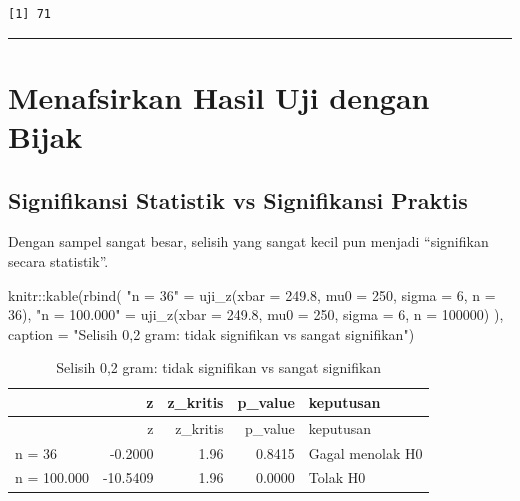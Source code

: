 \documentclass[
  indonesian,
  letterpaper,
]{book}
\newenvironment{Shaded}{\begin{snugshade}}{\end{snugshade}}
\newcommand{\AttributeTok}[1]{\textcolor[rgb]{0.40,0.45,0.13}{#1}}
\newcommand{\DecValTok}[1]{\textcolor[rgb]{0.68,0.00,0.00}{#1}}
\newcommand{\FloatTok}[1]{\textcolor[rgb]{0.68,0.00,0.00}{#1}}
\newcommand{\FunctionTok}[1]{\textcolor[rgb]{0.28,0.35,0.67}{#1}}
\newcommand{\NormalTok}[1]{\textcolor[rgb]{0.00,0.23,0.31}{#1}}
\newcommand{\OtherTok}[1]{\textcolor[rgb]{0.00,0.23,0.31}{#1}}
\newcommand{\SpecialCharTok}[1]{\textcolor[rgb]{0.37,0.37,0.37}{#1}}
\newcommand{\StringTok}[1]{\textcolor[rgb]{0.13,0.47,0.30}{#1}}
\begin{document}
\begin{verbatim}
[1] 71
\end{verbatim}

\begin{center}\rule{0.5\linewidth}{0.5pt}\end{center}

\section{Menafsirkan Hasil Uji dengan
Bijak}\label{menafsirkan-hasil-uji-dengan-bijak}

\subsection{Signifikansi Statistik vs Signifikansi
Praktis}\label{signifikansi-statistik-vs-signifikansi-praktis}

Dengan sampel sangat besar, selisih yang sangat kecil pun menjadi
``signifikan secara statistik''.

\begin{Shaded}
\begin{Highlighting}[]
\NormalTok{knitr}\SpecialCharTok{::}\FunctionTok{kable}\NormalTok{(}\FunctionTok{rbind}\NormalTok{(}
  \StringTok{"n = 36"}      \OtherTok{=} \FunctionTok{uji\_z}\NormalTok{(}\AttributeTok{xbar =} \FloatTok{249.8}\NormalTok{, }\AttributeTok{mu0 =} \DecValTok{250}\NormalTok{, }\AttributeTok{sigma =} \DecValTok{6}\NormalTok{, }\AttributeTok{n =} \DecValTok{36}\NormalTok{),}
  \StringTok{"n = 100.000"} \OtherTok{=} \FunctionTok{uji\_z}\NormalTok{(}\AttributeTok{xbar =} \FloatTok{249.8}\NormalTok{, }\AttributeTok{mu0 =} \DecValTok{250}\NormalTok{, }\AttributeTok{sigma =} \DecValTok{6}\NormalTok{, }\AttributeTok{n =} \DecValTok{100000}\NormalTok{)}
\NormalTok{), }\AttributeTok{caption =} \StringTok{"Selisih 0,2 gram: tidak signifikan vs sangat signifikan"}\NormalTok{)}
\end{Highlighting}
\end{Shaded}

\begin{longtable}[]{@{}lrrrl@{}}
\caption{Selisih 0,2 gram: tidak signifikan vs sangat
signifikan}\tabularnewline
\toprule\noalign{}
& z & z\_kritis & p\_value & keputusan \\
\midrule\noalign{}
\endfirsthead
\toprule\noalign{}
& z & z\_kritis & p\_value & keputusan \\
\midrule\noalign{}
\endhead
\bottomrule\noalign{}
\endlastfoot
n = 36 & -0.2000 & 1.96 & 0.8415 & Gagal menolak H0 \\
n = 100.000 & -10.5409 & 1.96 & 0.0000 & Tolak H0 \\
\end{longtable}
\end{document}
